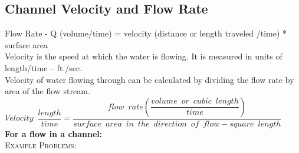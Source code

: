 \subsection{Channel Velocity and Flow Rate}
Flow Rate - Q (volume/time) = velocity (distance or length traveled /time) * surface area\\
Velocity is the speed at which the water is flowing.  It is measured in units of length/time – ft./sec.\\
Velocity of water flowing through can be calculated by dividing the flow rate by area of the flow stream.\\
\vspace{0.5cm}
$Velocity \enspace \dfrac{length}{time}= \dfrac{flow \enspace rate(\dfrac{volume \enspace or \enspace cubic \enspace length}{time})}{surface \enspace area \enspace in \enspace the \enspace direction \enspace of \enspace flow-square \enspace length}$\\
\vspace{0.5cm}
\textbf{For a flow in a channel:}\\
\vspace{0.5cm}
\noindent\textsc{Example Problems:}\\
